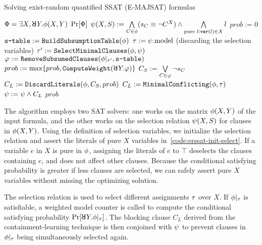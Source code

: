 \begin{algorithm}[p]
    \caption{Solving exist-random quantified SSAT (E-MAJSAT) formulas}
    \label{alg:erssat}
    \begin{algorithmic}[1]
        \REQUIRE $\Qf=\exists X,\random{} Y.\pf(X,Y)$
        \ENSURE $\Pr[\Phi]$
        \STATE $\psi(X,S) := \bigwedge\limits_{C\in\phi}(s_{C}\equiv\lnot C^X)\land\bigwedge\limits_{\text{pure }l: \texttt{var}(l)\in X}l$\label{code:erssat-init-select}
        \STATE $prob := 0$
        \STATE $\texttt{s-table} := \texttt{BuildSubsumptionTable}(\phi)$\label{code:erssat-subsume-table}
        \WHILE{($\sat{\select}$)}
        \STATE $\tau := \psi.\mathrm{model}$ (discarding the selection variables)
        \IF{($\sat{\pcf{\pf}{\as}}$)}
        \STATE $\tau' := \texttt{SelectMinimalClauses}(\phi,\psi)$\label{code:erssat-minimal-clauses}
        \STATE $\varphi := \texttt{RemoveSubsumedClauses}(\phi|_{\tau'},\texttt{s-table})$\label{code:erssat-subsume-clauses}
        \STATE $prob := \max\{prob,\texttt{ComputeWeight}(\random{} Y.\varphi)\}$\label{code:erssat-wmc}
        \STATE $C_S := \bigvee\limits_{C\in\varphi}\lnot s_{C}$
        \STATE $C_L := \texttt{DiscardLiterals}(\phi,C_S,prob)$\label{code:erssat-discard-literals}
        \ELSE
        \STATE $C_L := \texttt{MinimalConflicting}(\phi,\tau)$
        \ENDIF
        \STATE $\psi := \psi \land C_L$
        \ENDWHILE
        \RETURN $prob$
    \end{algorithmic}
\end{algorithm}

The algorithm employs two SAT solvers:
one works on the matrix $\phi(X,Y)$ of the input formula,
and the other works on the selection relation $\psi(X,S)$ for clauses in $\phi(X,Y)$.
Using the definition of selection variables,
we initialize the selection relation and assert the literals of pure $X$ variables in~\cref{code:erssat-init-select}.
If a variable $e$ in $X$ is pure in $\phi$,
assigning the literals of $e$ to $\top$ deselects the clauses containing $e$,
and does not affect other clauses.
Because the conditional satisfying probability is greater if less clauses are selected,
we can safely assert pure $X$ variables without missing the optimizing solution.

The selection relation is used to select different assignments $\tau$ over $X$.
If $\phi|_{\tau}$ is satisfiable,
a weighted model counter is called to compute the conditional satisfying probability $\spb{\random{} Y.\pcf{\pf}{\as}}$.
The blocking clause $C_L$ derived from the containment-learning technique is then conjoined with $\psi$ to prevent clauses in $\phi|_{\tau}$ being simultaneously selected again.

